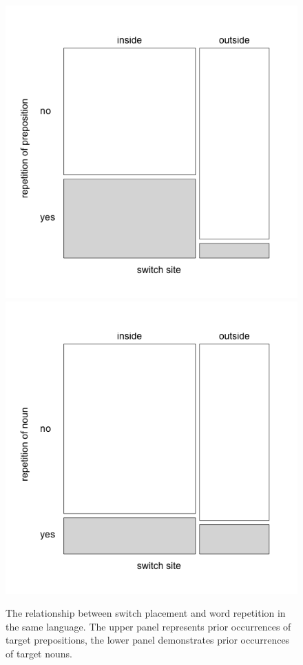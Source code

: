 \begin{figure}
	\includegraphics[scale=0.3]{figures/5-Figure_4a.png}	%
	\includegraphics[scale=0.3]{figures/5-Figure_4b.png}	
		\caption{The relationship between switch placement and word repetition in the same language. The upper panel represents prior occurrences of target prepositions, the lower panel demonstrates prior occurrences of target nouns.}
	\label{fig:5:4}
\end{figure}

